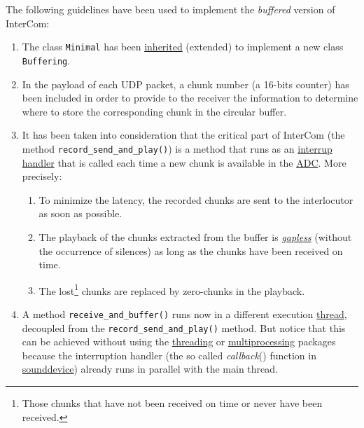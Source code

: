 The following guidelines have been used to implement the
\emph{buffered} version of InterCom:

\begin{enumerate}
\item The class \texttt{Minimal} has been
  \href{https://en.wikipedia.org/wiki/Inheritance_(object-oriented_programming)}{inherited}
  (extended) to implement a new class \texttt{Buffering}.
\item In the payload of each UDP packet, a chunk number (a 16-bits
  counter) has been included in order to provide to the receiver the
  information to determine where to store the corresponding chunk in
  the circular buffer.
\item It has been taken into consideration that the critical part of
  InterCom (the method \verb|record_send_and_play()|) is a method that
  runs as an
  \href{https://en.wikipedia.org/wiki/Interrupt_handler}{interrup
    handler} that is called each time a new chunk is available in the
  \href{https://en.wikipedia.org/wiki/Analog-to-digital_converter}{ADC}. More
  precisely:
  \begin{enumerate}
  \item To minimize the latency, the recorded chunks are sent
    to the interlocutor as soon as possible.
  \item The playback of the chunks extracted from the buffer is
    \href{https://en.wikipedia.org/wiki/Gapless_playback}{\emph{gapless}}
    (without the occurrence of silences) as long as the chunks have
    been received on time.
  \item The lost\footnote{Those chunks that have not been
  received on time or never have been received.} chunks are replaced
    by zero-chunks in the playback.
  \end{enumerate}
\item A method \verb|receive_and_buffer()| runs now in a different
  execution
  \href{https://en.wikipedia.org/wiki/Thread_(computing)}{thread},
  decoupled from the \verb|record_send_and_play()| method. But notice
  that this can be achieved without using the
  \href{https://docs.python.org/3/library/threading.html}{threading}
  or
  \href{https://docs.python.org/3/library/multiprocessing.html}{multiprocessing}
  packages because the interruption handler (the so called
  \emph{callback}() function in
  \href{https://python-sounddevice.readthedocs.io/en/0.3.14/api.html}{sounddevice})
  already runs in parallel with the main thread.
\end{enumerate}

